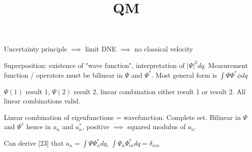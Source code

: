 \documentclass{article}
\title{QM}
\date{}
\begin{document}
\maketitle

Uncertainty principle $\implies$ limit DNE $\implies$ no classical velocity

Superposition: existence of "wave function", interpretation of $|\Psi|^2dq$. Measurement function / operators must be bilinear in $\Psi$ and $\Psi^*$. Most general form is $\int \Psi \Psi^* \phi dq$

$\Psi(1)$ result 1, $\Psi(2)$ result 2, linear combination either result 1 or result 2. All linear combinations valid. 

Linear combination of eigenfunctions = wavefunction. Complete set. Bilinear in $\Psi$ and $\Psi^*$ hence in $a_n$ and $a_n^*$, positive $\implies$ squared modulus of $a_n$.

Can derive [23] that $a_n = \int \Psi \Psi_n^* dq$, $\int \Psi_n \Psi_m^* dq = \delta_{nm}$
\end{document}

